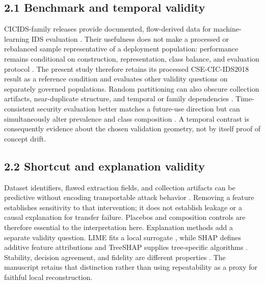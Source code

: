 \documentclass[preprint,12pt]{elsarticle}
\begin{document}
\subsection{2.1 Benchmark and temporal validity}
CICIDS-family releases provide documented, flow-derived data for machine-learning IDS evaluation \cite{sharafaldin2018toward, cse_cic_ids2018_official, cicids2017_official}. Their usefulness does not make a processed or rebalanced sample representative of a deployment population: performance remains conditional on construction, representation, class balance, and evaluation protocol \cite{ring2019survey, he2009imbalanced, sommer2010closed}. The present study therefore retains its processed CSE-CIC-IDS2018 result as a reference condition and evaluates other validity questions on separately governed populations.
Random partitioning can also obscure collection artifacts, near-duplicate structure, and temporal or family dependencies \cite{engelen2021troubleshooting, arp2022dos}. Time-consistent security evaluation better matches a future-use direction but can simultaneously alter prevalence and class composition \cite{pendlebury2019tesseract}. A temporal contrast is consequently evidence about the chosen validation geometry, not by itself proof of concept drift.

\subsection{2.2 Shortcut and explanation validity}
Dataset identifiers, flawed extraction fields, and collection artifacts can be predictive without encoding transportable attack behavior \cite{engelen2021troubleshooting, arp2022dos}. Removing a feature establishes sensitivity to that intervention; it does not establish leakage or a causal explanation for transfer failure. Placebos and composition controls are therefore essential to the interpretation here.
Explanation methods add a separate validity question. LIME fits a local surrogate \cite{ribeiro2016lime}, while SHAP defines additive feature attributions and TreeSHAP supplies tree-specific algorithms \cite{lundberg2017shap, lundberg2020trees}. Stability, decision agreement, and fidelity are different properties \cite{yeh2019infidelity}. The manuscript retains that distinction rather than using repeatability as a proxy for faithful local reconstruction.
\end{document}
